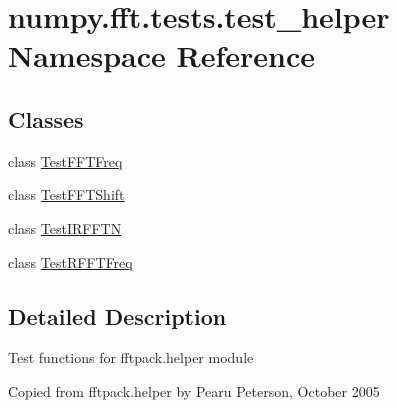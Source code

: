 \hypertarget{namespacenumpy_1_1fft_1_1tests_1_1test__helper}{}\section{numpy.\+fft.\+tests.\+test\+\_\+helper Namespace Reference}
\label{namespacenumpy_1_1fft_1_1tests_1_1test__helper}
\subsection*{Classes}
\begin{DoxyCompactItemize}
\item 
class \hyperlink{classnumpy_1_1fft_1_1tests_1_1test__helper_1_1TestFFTFreq}{Test\+F\+F\+T\+Freq}
\item 
class \hyperlink{classnumpy_1_1fft_1_1tests_1_1test__helper_1_1TestFFTShift}{Test\+F\+F\+T\+Shift}
\item 
class \hyperlink{classnumpy_1_1fft_1_1tests_1_1test__helper_1_1TestIRFFTN}{Test\+I\+R\+F\+F\+TN}
\item 
class \hyperlink{classnumpy_1_1fft_1_1tests_1_1test__helper_1_1TestRFFTFreq}{Test\+R\+F\+F\+T\+Freq}
\end{DoxyCompactItemize}


\subsection{Detailed Description}
\begin{DoxyVerb}Test functions for fftpack.helper module

Copied from fftpack.helper by Pearu Peterson, October 2005\end{DoxyVerb}
 